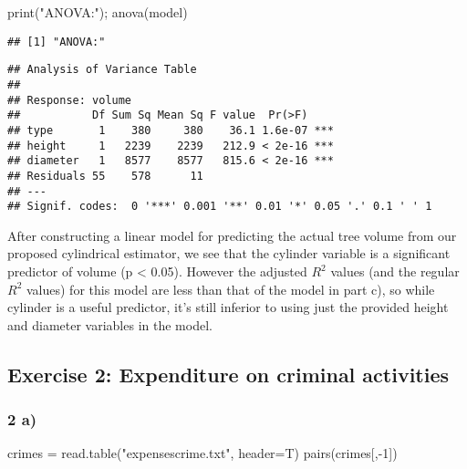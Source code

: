 \documentclass[
  11pt,
]{article}
\newenvironment{Shaded}{\begin{snugshade}}{\end{snugshade}}
\newcommand{\AttributeTok}[1]{\textcolor[rgb]{0.77,0.63,0.00}{#1}}
\newcommand{\DecValTok}[1]{\textcolor[rgb]{0.00,0.00,0.81}{#1}}
\newcommand{\FunctionTok}[1]{\textcolor[rgb]{0.00,0.00,0.00}{#1}}
\newcommand{\NormalTok}[1]{#1}
\newcommand{\OtherTok}[1]{\textcolor[rgb]{0.56,0.35,0.01}{#1}}
\newcommand{\SpecialCharTok}[1]{\textcolor[rgb]{0.00,0.00,0.00}{#1}}
\newcommand{\StringTok}[1]{\textcolor[rgb]{0.31,0.60,0.02}{#1}}
\begin{document}
\begin{Shaded}
\begin{Highlighting}[]
\FunctionTok{print}\NormalTok{(}\StringTok{"ANOVA:"}\NormalTok{); }\FunctionTok{anova}\NormalTok{(model)}
\end{Highlighting}
\end{Shaded}

\begin{verbatim}
## [1] "ANOVA:"
\end{verbatim}

\begin{verbatim}
## Analysis of Variance Table
## 
## Response: volume
##           Df Sum Sq Mean Sq F value  Pr(>F)    
## type       1    380     380    36.1 1.6e-07 ***
## height     1   2239    2239   212.9 < 2e-16 ***
## diameter   1   8577    8577   815.6 < 2e-16 ***
## Residuals 55    578      11                    
## ---
## Signif. codes:  0 '***' 0.001 '**' 0.01 '*' 0.05 '.' 0.1 ' ' 1
\end{verbatim}

After constructing a linear model for predicting the actual tree volume
from our proposed cylindrical estimator, we see that the cylinder
variable is a significant predictor of volume (p \textless{} 0.05).
However the adjusted \(R^2\) values (and the regular \(R^2\) values) for
this model are less than that of the model in part c), so while cylinder
is a useful predictor, it's still inferior to using just the provided
height and diameter variables in the model.

\hypertarget{exercise-2-expenditure-on-criminal-activities}{%
\subsection{Exercise 2: Expenditure on criminal
activities}\label{exercise-2-expenditure-on-criminal-activities}}

\hypertarget{a-1}{%
\subsubsection{2 a)}\label{a-1}}

\begin{Shaded}
\begin{Highlighting}[]
\NormalTok{crimes }\OtherTok{=} \FunctionTok{read.table}\NormalTok{(}\StringTok{"expensescrime.txt"}\NormalTok{, }\AttributeTok{header=}\NormalTok{T)}
\FunctionTok{pairs}\NormalTok{(crimes[,}\SpecialCharTok{{-}}\DecValTok{1}\NormalTok{])}
\end{Highlighting}
\end{Shaded}
\end{document}
